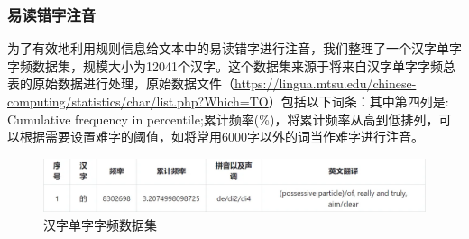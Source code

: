 \documentclass[12pt,hyperref,a4paper,UTF8]{ctexart}
\begin{document}
\subsubsection{易读错字注音}
为了有效地利用规则信息给文本中的易读错字进行注音，我们整理了一个汉字单字字频数据集，规模大小为12041个汉字。这个数据集来源于将来自汉字单字字频总表的原始数据进行处理，原始数据文件（\url{https://lingua.mtsu.edu/chinese-computing/statistics/char/list.php?Which=TO}）包括以下词条：其中第四列是: Cumulative frequency in percentile;累计频率(\%)，将累计频率从高到低排列，可以根据需要设置难字的阈值，如将常用6000字以外的词当作难字进行注音。
\begin{figure}[H]
    \centering
    \includegraphics[width=0.7\linewidth]{figures/image5.png}
    \caption{汉字单字字频数据集}
    \label{fig:fig4}
\end{figure}
\end{document}
